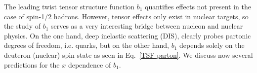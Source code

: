 The leading twist tensor structure function $b_1$ quantifies effects not present in 
the case of spin-1/2 hadrons. However, tensor effects only
exist in nuclear targets, so the study of $b_1$ serves as a very interesting bridge between nucleon and nuclear physics.
On the one hand, deep inelastic scattering (DIS), clearly probes partonic degrees of freedom, i.e. quarks, but on the 
other hand, $b_1$ depends solely on the deuteron (nuclear) spin state as seen in Eq.~\ref{TSF-parton}. We discuss now several predictions for the $x$ dependence of $b_1$.


%
